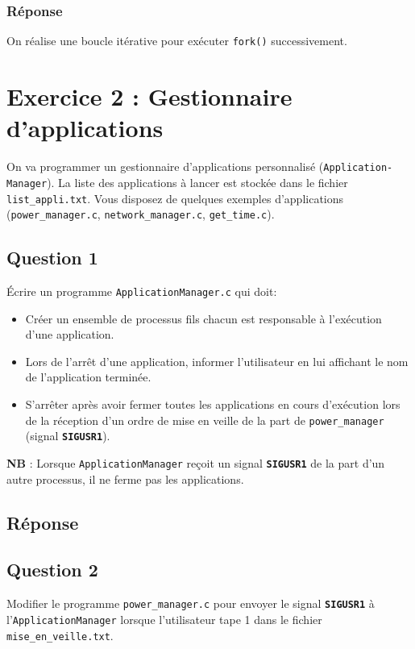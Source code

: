 \documentclass[
	12pt, %
]{fphw}
\begin{document}
\subsubsection*{Réponse}

On réalise une boucle itérative pour exécuter \texttt{fork()} successivement. 

\section*{Exercice 2 : Gestionnaire d'applications}
On va programmer un gestionnaire d'applications personnalisé (\texttt{Application-Manager}). La liste des applications à lancer est stockée dans le fichier \texttt{list\_appli.txt}. Vous disposez de quelques exemples d'applications (\texttt{power\_manager.c}, \texttt{network\_manager.c}, \texttt{get\_time.c}).

\subsection*{Question 1}
Écrire un programme \texttt{ApplicationManager.c} qui doit:
\begin{itemize}
	\item Créer un ensemble de processus fils chacun est responsable à l'exécution d'une application.
	\item Lors de l'arrêt d'une application, informer l'utilisateur en lui affichant le nom de l'application terminée.
	\item S'arrêter après avoir fermer toutes les applications en cours d'exécution lors de la réception d'un ordre de mise en veille de la part de \texttt{power\_manager} (signal \texttt{\textbf{SIGUSR1}}).
\end{itemize}
\textbf{NB} : Lorsque \texttt{ApplicationManager} reçoit un signal \texttt{\textbf{SIGUSR1}} de la part d'un autre processus, il ne ferme pas les applications.
\subsection*{Réponse}

\subsection*{Question 2}
Modifier le programme \texttt{power\_manager.c} pour envoyer le signal \texttt{\textbf{SIGUSR1}} à l'\texttt{ApplicationManager} lorsque l'utilisateur tape 1 dans le fichier \texttt{mise\_en\_veille.txt}.
\end{document}
